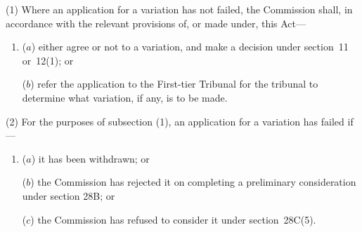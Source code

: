 \documentclass[12pt,a4paper]{article}
\begin{document}
%

(1) Where an application for a variation has not failed, the 
Commission  %
shall, in accordance with the relevant provisions of, or made under, this Act—
\begin{enumerate}\item[]
($a$) either agree or not to a variation, and make a decision under section~11 or~12(1); or

($b$) refer the application to 
the First-tier Tribunal  %
for the tribunal to determine what variation, if any, is to be made.
\end{enumerate}

(2) For the purposes of subsection (1), 
an application for a variation  %
has failed if—
\begin{enumerate}\item[]
($a$) it has 
been withdrawn; or

($b$) the 
Commission  %
has rejected it on completing a preliminary consideration under section 28B;
or  %

($c$) the 
Commission  %
has refused to consider it under section~28C(5).
\end{enumerate}
\end{document}
